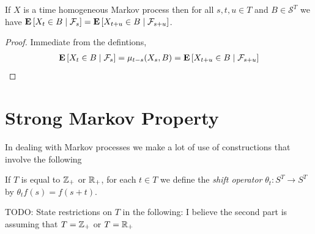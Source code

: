 \begin{prop}If $X$ is a time homogeneous Markov process then
for all $s,t,u \in T$ and $B
  \in \mathcal{S}^T$ we have
  $\cexpectationlong{\mathcal{F}_s}{X_t \in B} = \cexpectationlong{\mathcal{F}_{s+u}}{X_{t+u} \in B}$.
\end{prop}
\begin{proof}
Immediate from the defintions,
\begin{align*}
\cexpectationlong{\mathcal{F}_s}{X_t \in B} = \mu_{t-s}(X_s, B) = \cexpectationlong{\mathcal{F}_{s+u}}{X_{t+u} \in B}
\end{align*}
\end{proof}

\section{Strong Markov Property}

In dealing with Markov processes we make a lot of use of constructions
that involve the following
\begin{defn}If $T$ is equal to $\integers_+$ or $\reals_+$, for each
  $t \in T$ we define
  the \emph{shift operator}  $\theta_t : S^T \to S^T$ by $\theta_t f
  (s) = f(s +t)$.
\end{defn}

TODO: State restrictions on $T$ in the following: I believe the second part is assuming that $T = \integers_+$ or $T = \reals_+$

